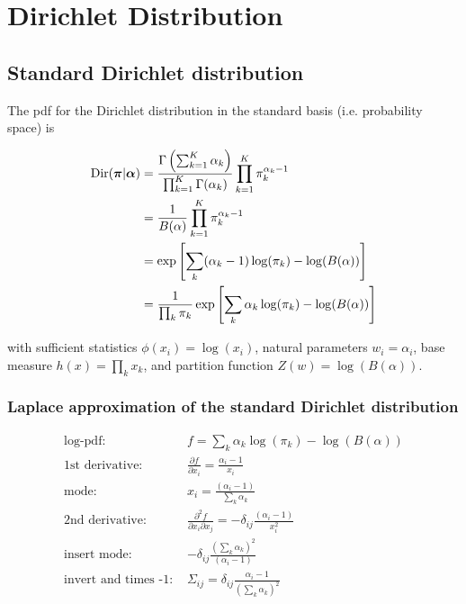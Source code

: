 \section{Dirichlet Distribution}

\subsection{Standard Dirichlet distribution}

The pdf for the Dirichlet distribution in the standard basis (i.e. probability space) is

\begin{align}
\mathrm{Dir}(\boldsymbol{\pi} | {\boldsymbol{\alpha}}) &= \frac{\Gamma \left( \sum_{k=1}^K \alpha_k \right)}{\prod_{k=1}^K \Gamma(\alpha_k)} \prod_{k=1}^K \pi_k^{\alpha_k-1} \\
&= \frac{1}{B(\alpha)} \prod_{k=1}^K \pi_k^{\alpha_k-1} \\
&= \exp\left[\sum_k(\alpha_k-1)\log(\pi_k) - \log(B(\alpha))\right] \\
&= \frac{1}{\prod_k \pi_k} \exp\left[\sum_k\alpha_k\log(\pi_k) - \log(B(\alpha))\right] \\
\end{align}

with sufficient statistics $\phi(x_i) = \log(x_i)$, natural parameters $w_i=\alpha_i$, base measure $h(x) = \prod_k x_k$, and partition function $Z(w) = \log(B(\alpha))$.

\subsubsection{Laplace approximation of the standard Dirichlet distribution}

\begin{align*}
\text{log-pdf: } & f = \sum_k\alpha_k\log(\pi_k) - \log(B(\alpha)) \\
\text{1st derivative: }&  \frac{\partial f}{\partial x_i} =  \frac{\alpha_i-1}{x_i}\\
\text{mode: }& x_i = \frac{(\alpha_i - 1)}{\sum_k \alpha_k} \\
\text{2nd derivative: }&  \frac{\partial^2 f}{\partial x_i \partial x_j} = - \delta_{ij} \frac{(\alpha_i - 1)}{x_i^2} \\
\text{insert mode: }& - \delta_{ij}\frac{(\sum_k \alpha_k)^2}{(\alpha_i - 1)} \\
\text{invert and times -1: }&\Sigma_{ij} = \delta_{ij} \frac{\alpha_i - 1}{(\sum_k \alpha_k)^2}
\end{align*}


